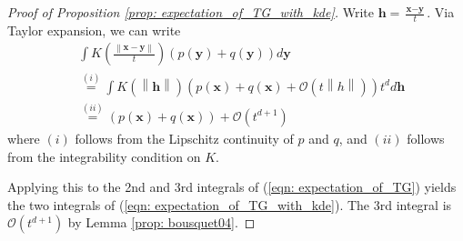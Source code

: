 \documentclass{article}
\newcommand{\norm}[1]{\left\lVert#1\right\rVert}
\newcommand{\x}{\textbf{x}}
\newcommand{\y}{\textbf{y}}
\theoremstyle{alden}
\theoremstyle{definition}
\theoremstyle{remark}
\begin{document}
\begin{proof}[Proof of Proposition \ref{prop: expectation_of_TG_with_kde}]
	Write $\mathbf{h} = \frac{\x - \y}{t}$. Via Taylor expansion, we can write
	\begin{align*}
	& \int K\left(\frac{\norm{\x - \y}}{t}\right) (p(\y) + q(\y) ) d\y \\
	& \overset{(i)}{=} \int K(\norm{\mathbf{h}}) (p(\x) + q(\x) + \mathcal{O}(t \norm{h})) t^d d \mathbf{h} \\
	& \overset{(ii)}{=} (p(\x) + q(\x)) + \mathcal{O}(t^{d + 1})
	\end{align*}
	where $(i)$ follows from the Lipschitz continuity of $p$ and $q$, and $(ii)$ follows from the integrability condition on $K$. 
	
	Applying this to the 2nd and 3rd integrals of (\ref{eqn: expectation_of_TG}) yields the two integrals of (\ref{eqn: expectation_of_TG_with_kde}). The 3rd integral is $\mathcal{O}(t^{d + 1})$ by Lemma \ref{prop: bousquet04}.
\end{proof}
\end{document}
